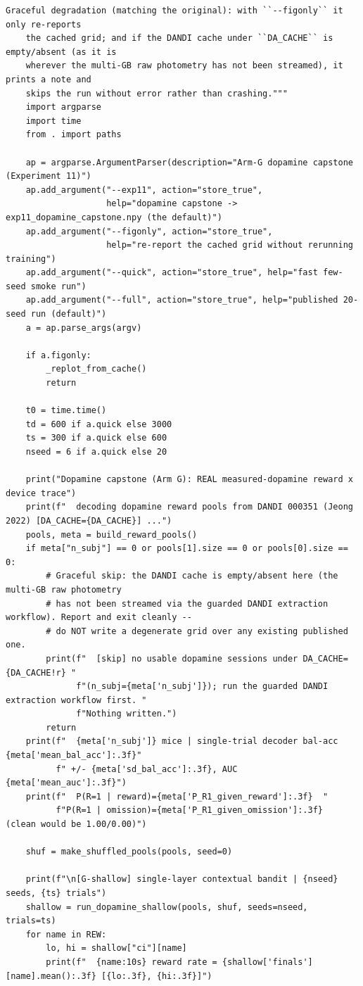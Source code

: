 \begin{lstlisting}[caption={mrl\_trace/dopamine.py},label={lst:siox-src-dopamine}]
    Graceful degradation (matching the original): with ``--figonly`` it only re-reports
    the cached grid; and if the DANDI cache under ``DA_CACHE`` is empty/absent (as it is
    wherever the multi-GB raw photometry has not been streamed), it prints a note and
    skips the run without error rather than crashing."""
    import argparse
    import time
    from . import paths

    ap = argparse.ArgumentParser(description="Arm-G dopamine capstone (Experiment 11)")
    ap.add_argument("--exp11", action="store_true",
                    help="dopamine capstone -> exp11_dopamine_capstone.npy (the default)")
    ap.add_argument("--figonly", action="store_true",
                    help="re-report the cached grid without rerunning training")
    ap.add_argument("--quick", action="store_true", help="fast few-seed smoke run")
    ap.add_argument("--full", action="store_true", help="published 20-seed run (default)")
    a = ap.parse_args(argv)

    if a.figonly:
        _replot_from_cache()
        return

    t0 = time.time()
    td = 600 if a.quick else 3000
    ts = 300 if a.quick else 600
    nseed = 6 if a.quick else 20

    print("Dopamine capstone (Arm G): REAL measured-dopamine reward x device trace")
    print(f"  decoding dopamine reward pools from DANDI 000351 (Jeong 2022) [DA_CACHE={DA_CACHE}] ...")
    pools, meta = build_reward_pools()
    if meta["n_subj"] == 0 or pools[1].size == 0 or pools[0].size == 0:
        # Graceful skip: the DANDI cache is empty/absent here (the multi-GB raw photometry
        # has not been streamed via the guarded DANDI extraction workflow). Report and exit cleanly --
        # do NOT write a degenerate grid over any existing published one.
        print(f"  [skip] no usable dopamine sessions under DA_CACHE={DA_CACHE!r} "
              f"(n_subj={meta['n_subj']}); run the guarded DANDI extraction workflow first. "
              f"Nothing written.")
        return
    print(f"  {meta['n_subj']} mice | single-trial decoder bal-acc {meta['mean_bal_acc']:.3f}"
          f" +/- {meta['sd_bal_acc']:.3f}, AUC {meta['mean_auc']:.3f}")
    print(f"  P(R=1 | reward)={meta['P_R1_given_reward']:.3f}  "
          f"P(R=1 | omission)={meta['P_R1_given_omission']:.3f}  (clean would be 1.00/0.00)")

    shuf = make_shuffled_pools(pools, seed=0)

    print(f"\n[G-shallow] single-layer contextual bandit | {nseed} seeds, {ts} trials")
    shallow = run_dopamine_shallow(pools, shuf, seeds=nseed, trials=ts)
    for name in REW:
        lo, hi = shallow["ci"][name]
        print(f"  {name:10s} reward rate = {shallow['finals'][name].mean():.3f} [{lo:.3f}, {hi:.3f}]")


\end{lstlisting}
